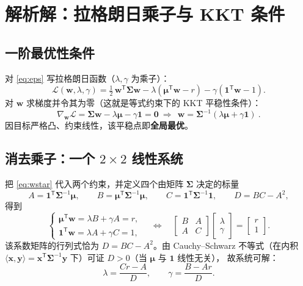 \documentclass[12pt]{ctexart}
\newcommand{\w}{\bm{w}}
\newcommand{\muv}{\bm{\mu}}
\newcommand{\Sig}{\bm{\Sigma}}
\newcommand{\one}{\mathbf{1}}
\newcommand{\T}{^{\mathsf{T}}}
\newcommand{\Sinv}{\Sig^{-1}}
\theoremstyle{definition}
\theoremstyle{plain}
\begin{document}
\section{解析解：拉格朗日乘子与 KKT 条件}
\label{sec:analytic}

\subsection{一阶最优性条件}
对 \eqref{eq:eps} 写拉格朗日函数（$\lambda,\gamma$ 为乘子）：
\begin{equation}
\mathcal L(\w,\lambda,\gamma)=\tfrac12\,\w\T\Sig\w-\lambda(\muv\T\w-r)-\gamma(\one\T\w-1).
\end{equation}
对 $\w$ 求梯度并令其为零（这就是等式约束下的 KKT 平稳性条件）：
\begin{equation}
\nabla_{\w}\mathcal L=\Sig\w-\lambda\muv-\gamma\one=\bm 0
\ \Longrightarrow\
\boxed{\ \w=\Sinv(\lambda\muv+\gamma\one)\ } .
\label{eq:wstar}
\end{equation}
因目标严格凸、约束线性，该平稳点即\textbf{全局最优}。

\subsection{消去乘子：一个 $2\times2$ 线性系统}
把 \eqref{eq:wstar} 代入两个约束，并定义四个由矩阵 $\Sig$ 决定的标量
\begin{equation}
A=\one\T\Sinv\muv,\qquad B=\muv\T\Sinv\muv,\qquad C=\one\T\Sinv\one,\qquad D=BC-A^2,
\label{eq:ABCD}
\end{equation}
得到
\begin{equation}
\begin{cases}
\muv\T\w=\lambda B+\gamma A=r,\\[2pt]
\one\T\w=\lambda A+\gamma C=1,
\end{cases}
\quad\Longleftrightarrow\quad
\begin{bmatrix}B & A\\ A & C\end{bmatrix}
\begin{bmatrix}\lambda\\ \gamma\end{bmatrix}
=\begin{bmatrix}r\\ 1\end{bmatrix}.
\end{equation}
该系数矩阵的行列式恰为 $D=BC-A^2$。由 Cauchy--Schwarz 不等式（在内积
$\langle\bm x,\bm y\rangle=\bm x\T\Sinv\bm y$ 下）可证 $D>0$（当 $\muv$ 与 $\one$ 线性无关），
故系统可解：
\begin{equation}
\lambda=\frac{Cr-A}{D},\qquad \gamma=\frac{B-Ar}{D}.
\label{eq:lamgam}
\end{equation}
\end{document}
